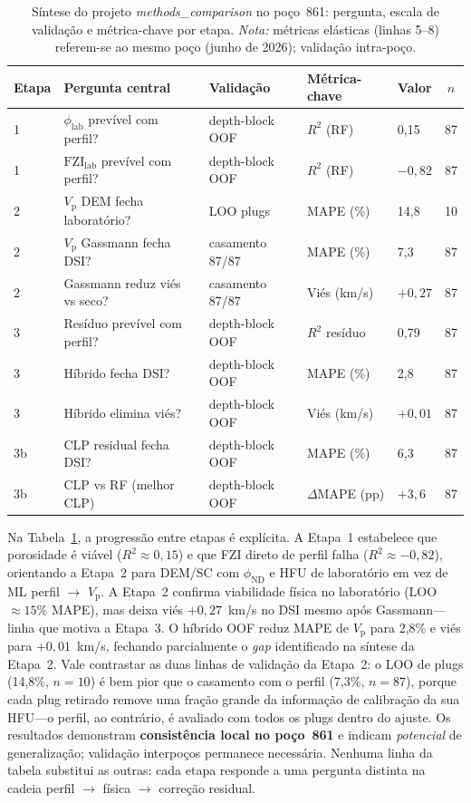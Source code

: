 \documentclass[11pt,a4paper]{article}
\numberwithin{equation}{section}
\newcommand{\Vp}{\ensuremath{V_{\mathrm{p}}}}
\newcommand{\philab}{\ensuremath{\phi_{\mathrm{lab}}}}
\newcommand{\fzilab}{\ensuremath{\mathrm{FZI}_{\mathrm{lab}}}}
\newcommand{\phiND}{\ensuremath{\phi_{\mathrm{ND}}}}
\begin{document}
\begin{table}[H]
  \centering
  \caption{Síntese do projeto \emph{methods\_comparison} no poço~861:
           pergunta, escala de validação e métrica-chave por etapa.
           \emph{Nota:} métricas elásticas (linhas 5--8) referem-se ao
           mesmo poço (junho de 2026); validação intra-poço.}
  \label{tab:project_summary}
  \small
  \begin{tabular}{p{1.4cm}p{3.6cm}p{2.8cm}p{2.2cm}p{1.6cm}c}
    \toprule
    Etapa & Pergunta central & Validação & Métrica-chave & Valor & $n$ \\
    \midrule
    1 & \philab{} prevível com perfil? & depth-block OOF & $R^2$ (RF) & 0,15 & 87 \\
    1 & \fzilab{} prevível com perfil? & depth-block OOF & $R^2$ (RF) & $-0{,}82$ & 87 \\
    2 & \Vp{} DEM fecha laboratório? & LOO plugs & MAPE (\%) & 14,8 & 10 \\
    2 & \Vp{} Gassmann fecha DSI? & casamento 87/87 & MAPE (\%) & 7,3 & 87 \\
    2 & Gassmann reduz viés vs seco? & casamento 87/87 & Viés (km/s) & $+0{,}27$ & 87 \\
    3 & Resíduo prevível com perfil? & depth-block OOF & $R^2$ resíduo & 0,79 & 87 \\
    3 & Híbrido fecha DSI? & depth-block OOF & MAPE (\%) & 2,8 & 87 \\
    3 & Híbrido elimina viés? & depth-block OOF & Viés (km/s) & $+0{,}01$ & 87 \\
    3b & CLP residual fecha DSI? & depth-block OOF & MAPE (\%) & 6,3 & 87 \\
    3b & CLP vs RF (melhor CLP) & depth-block OOF & $\Delta$MAPE (pp) & $+3{,}6$ & 87 \\
    \bottomrule
  \end{tabular}
\end{table}

Na Tabela~\ref{tab:project_summary}, a progressão entre etapas é explícita.
A Etapa~1 estabelece que porosidade é viável ($R^2 \approx 0{,}15$) e que FZI
direto de perfil falha ($R^2 \approx -0{,}82$), orientando a Etapa~2 para DEM/SC
com \phiND{} e HFU de laboratório em vez de ML perfil $\rightarrow$ \Vp{}.
A Etapa~2 confirma viabilidade física no laboratório (LOO $\approx 15\%$ MAPE),
mas deixa viés $+0{,}27$~km/s no DSI mesmo após Gassmann---linha que motiva
a Etapa~3.
O híbrido OOF reduz MAPE de \Vp{} para 2,8\% e viés para $+0{,}01$~km/s,
fechando parcialmente o \emph{gap} identificado na síntese da Etapa~2.
Vale contrastar as duas linhas de validação da Etapa~2: o LOO de plugs
(14,8\%, $n=10$) é bem pior que o casamento com o perfil (7,3\%, $n=87$),
porque cada plug retirado remove uma fração grande da informação de
calibração da sua HFU---o perfil, ao contrário, é avaliado com todos os plugs
dentro do ajuste.
Os resultados demonstram \textbf{consistência local no poço~861} e indicam
\emph{potencial} de generalização; validação interpoços permanece
necessária.
Nenhuma linha da tabela substitui as outras: cada etapa responde a uma pergunta
distinta na cadeia perfil $\rightarrow$ física $\rightarrow$ correção residual.
\end{document}
